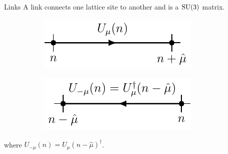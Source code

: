\documentclass[10pt,show notes on second screen]{beamer}
\begin{document}
\begin{frame}{Links}
A link connects one lattice site to another and is a $\mathrm{SU}(3)$ matrix.
\begin{figure}
    \centering
    \begin{subfigure}{0.48\textwidth}
        \centering
        \includegraphics{../figures/illustrations/lqcd/links/link}
        \label{fig:lqcd:link}
    \end{subfigure}
    \begin{subfigure}{0.48\textwidth}
        \centering
        \includegraphics{../figures/illustrations/lqcd/links/link-inverse}
        \label{fig:lqcd:link-inverse}
    \end{subfigure}
    \centering
\end{figure}
where $U_{-\mu}(n) = U_\mu(n - \hat{\mu})^\dagger$.
\end{frame}
\end{document}

